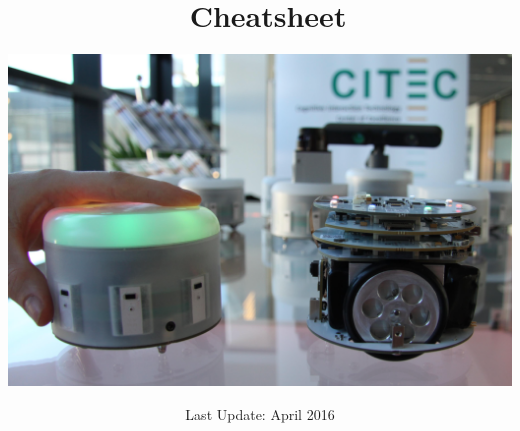 \title{\amiro\ Cheatsheet \\ }
\subtitle{\includegraphics[scale=0.3]{Bilder/AMiRos03.png}}
\date{Last Update: April 2016}

\maketitle

